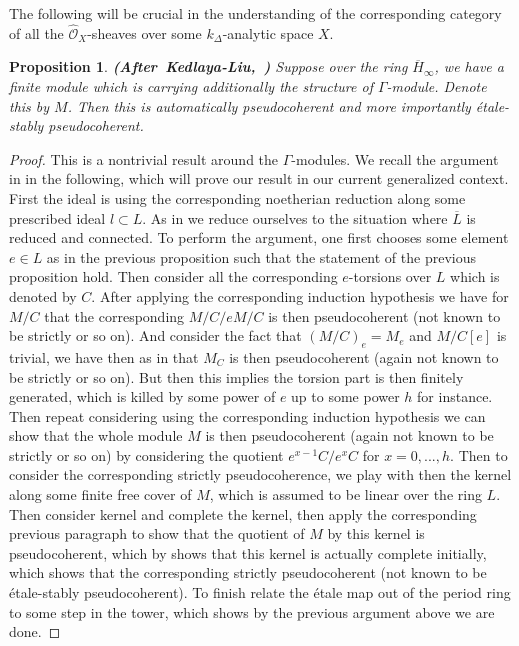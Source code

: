 \documentclass[12pt]{amsart}
\newtheorem{proposition}[theorem]{Proposition}
\theoremstyle{definition}
\numberwithin{equation}{section}
\begin{document}
\indent The following will be crucial in the understanding of the corresponding category of all the $\widehat{\mathcal{O}}_X$-sheaves over some $k_\Delta$-analytic space $X$.


\begin{proposition}\mbox{\bf{(After Kedlaya-Liu, \cite[Proposition 8.3.5]{KL16})}} \label{proposition615}
Suppose over the ring $\overline{H}_\infty$, we have a finite module which is carrying additionally the structure of $\Gamma$-module. Denote this by $M$. Then this is automatically pseudocoherent and more importantly \'etale-stably pseudocoherent.  
\end{proposition}

	
\begin{proof}
This is a nontrivial result around the $\Gamma$-modules. We recall the argument in \cite[Proposition 8.3.5]{KL16} in the following, which will prove our result in our current generalized context. First the ideal is using the corresponding noetherian reduction along some prescribed ideal $l\subset L$. As in \cite[Proposition 8.3.5]{KL16} we reduce ourselves to the situation where $\overline{L}$ is reduced and connected. To perform the argument, one first chooses some element $e\in L$ as in the previous proposition such that the statement of the previous proposition hold. Then consider all the corresponding $e$-torsions over $L$ which is denoted by $C$. After applying the corresponding induction hypothesis we have for $M/C$ that the corresponding $M/C/eM/C$ is then pseudocoherent (not known to be strictly or so on). And consider the fact that $(M/C)_e=M_e$ and $M/C[e]$ is trivial, we have then as in \cite[Proposition 8.3.5, Lemma 1.5.8]{KL16}	that $M_C$ is then pseudocoherent (again not known to be strictly or so on). But then this implies the torsion part is then finitely generated, which is killed by some power of $e$ up to some power $h$ for instance. Then repeat considering using the corresponding induction hypothesis we can show that the whole module $M$ is then pseudocoherent (again not known to be strictly or so on) by considering the quotient $e^{x-1}C/e^{x}C$ for $x=0,...,h$. Then to consider the corresponding strictly pseudocoherence, we play with then the kernel along some finite free cover of $M$, which is assumed to be linear over the ring $L$. Then consider kernel and complete the kernel, then apply the corresponding previous paragraph to show that the quotient of $M$ by this kernel is pseudocoherent, which by \cite[Corollary 1.2.11]{KL16} shows that this kernel is actually complete initially, which shows that the corresponding strictly pseudocoherent (not known to be \'etale-stably pseudocoherent). To finish relate the \'etale map out of the period ring to some step in the tower, which shows by the previous argument above we are done.
\end{proof}
\end{document}
